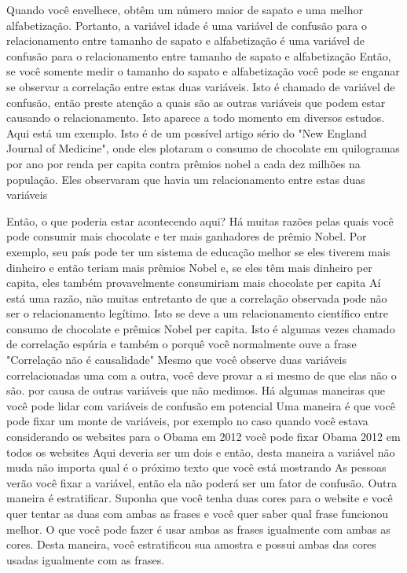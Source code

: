\begin{multicols}{2}
\begin{footnotesize}
Quando você envelhece, obtêm um número maior de sapato e uma melhor alfabetização. Portanto, a variável idade é uma variável de confusão para o relacionamento entre tamanho de sapato e alfabetização é uma variável de confusão para o relacionamento entre tamanho de sapato e alfabetização Então, se você somente medir o tamanho do sapato e alfabetização você pode se enganar se observar a correlação entre estas duas variáveis. Isto é chamado de variável de confusão, então preste atenção a quais são as outras variáveis que podem estar causando o relacionamento. Isto aparece a todo momento em diversos estudos. Aqui está um exemplo. Isto é de um possível artigo sério do "New England Journal of Medicine", onde eles plotaram o consumo de chocolate em quilogramas por ano por renda per capita contra prêmios nobel a cada dez milhões na população. Eles observaram que havia um relacionamento entre estas duas variáveis 

Então, o que poderia estar acontecendo aqui? Há muitas razões pelas quais você pode consumir mais chocolate e ter mais ganhadores de prêmio Nobel. Por exemplo, seu país pode ter um sistema de educação melhor se eles tiverem mais dinheiro e então teriam mais prêmios Nobel e, se eles têm mais dinheiro per capita, eles também provavelmente consumiriam mais chocolate per capita Aí está uma razão, não muitas entretanto de que a correlação observada pode não ser o relacionamento legítimo. Isto se deve a um relacionamento científico entre consumo de chocolate e prêmios Nobel per capita. Isto é algumas vezes chamado de correlação espúria e também o porquê você normalmente ouve a frase "Correlação não é causalidade" Mesmo que você observe duas variáveis correlacionadas uma com a outra,  você deve provar a si mesmo de que elas não o são. por causa de outras variáveis que não medimos. Há algumas maneiras que você pode lidar com variáveis de confusão em potencial Uma maneira é que você pode fixar um monte de variáveis, por exemplo no caso quando você estava considerando os websites para o Obama em 2012 você pode fixar Obama 2012 em todos os websites Aqui deveria ser um dois e então, desta maneira a variável não muda não importa qual é o próximo texto que você está mostrando As pessoas verão você fixar a variável, então ela não poderá ser um fator de confusão. Outra maneira é estratificar. Suponha que você tenha duas cores para o website e você quer tentar as duas com ambas as frases e você quer saber qual frase funcionou melhor. O que você pode fazer é usar ambas as frases igualmente com ambas as cores. Desta maneira, você estratificou sua amostra e possui ambas das cores usadas igualmente com as frases. 


\end{footnotesize}
\end{multicols}

